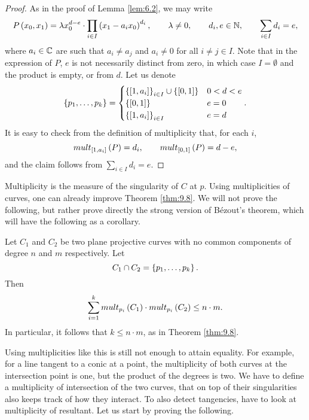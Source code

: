 \begin{proof}
As in the proof of Lemma \ref{lem:6.2}, we may write
$$ P\left( x_0, x_1 \right) = \lambda x_0^{d - e} \cdot \prod_{i \in I} \left( x_1 - a_ix_0 \right)^{d_i}, \qquad \lambda \ne 0, \qquad d_i, e \in \mathbb{N}, \qquad \sum_{i \in I} d_i = e, $$
where $ a_i \in \mathbb{C} $ are such that $ a_i \ne a_j $ and $ a_i \ne 0 $ for all $ i \ne j \in I $. Note that in the expression of $ P $, $ e $ is not necessarily distinct from zero, in which case $ I = \emptyset $ and the product is empty, or from $ d $. Let us denote
$$ \left\{ p_1, \dots, p_k \right\} =
\begin{cases}
\left\{ \left[ 1, a_i \right] \right\}_{i \in I} \cup \left\{ \left[ 0, 1 \right] \right\} & 0 < d < e \\
\left\{ \left[ 0, 1 \right] \right\} & e = 0 \\
\left\{ \left[ 1, a_i \right] \right\}_{i \in I} & e = d
\end{cases}.
$$
It is easy to check from the definition of multiplicity that, for each $ i $,
$$ mult_{\left[ 1, a_i \right]}\left( P \right) = d_i, \qquad mult_{\left[ 0, 1 \right]}\left( P \right) = d - e, $$
and the claim follows from $ \sum_{i \in I} d_i = e $.
\end{proof}

\pagebreak


Multiplicity is the measure of the singularity of $ C $ at $ p $. Using multiplicities of curves, one can already improve Theorem \ref{thm:9.8}. We will not prove the following, but rather prove directly the strong version of B\'ezout's theorem, which will have the following as a corollary.

\begin{theorem}
\label{thm:11.6}
Let $ C_1 $ and $ C_2 $ be two plane projective curves with no common components of degree $ n $ and $ m $ respectively. Let
$$ C_1 \cap C_2 = \left\{ p_1, \dots, p_k \right\}. $$
Then
$$ \sum_{i = 1}^k mult_{p_i}\left( C_1 \right) \cdot mult_{p_i}\left( C_2 \right) \le n \cdot m. $$
In particular, it follows that $ k \le n \cdot m $, as in Theorem \ref{thm:9.8}.
\end{theorem}

Using multiplicities like this is still not enough to attain equality. For example, for a line tangent to a conic at a point, the multiplicity of both curves at the intersection point is one, but the product of the degrees is two. We have to define a multiplicity of intersection of the two curves, that on top of their singularities also keeps track of how they interact. To also detect tangencies, have to look at multiplicity of resultant. Let us start by proving the following.

